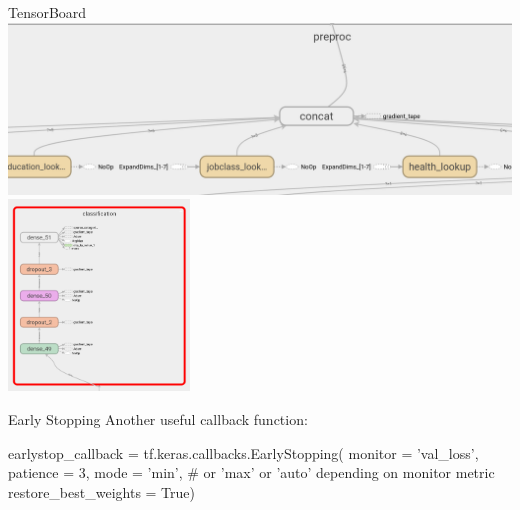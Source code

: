 \documentclass[ignorenonframetext,xcolor=x11names]{beamer}
\begin{document}
\begin{frame}{TensorBoard}
\centering
\includegraphics[width=.8\textwidth]{screen10.png} \\
\vspace{\baselineskip}
\includegraphics[height=2in]{screen9.png}
\end{frame}

\begin{frame}[fragile]{Early Stopping}
Another useful callback function:

\begin{pythoncode}
earlystop_callback = tf.keras.callbacks.EarlyStopping(
    monitor = 'val_loss',
    patience = 3,
    mode = 'min', 
    # or 'max' or 'auto' depending on monitor metric
    restore_best_weights = True)
\end{pythoncode}
\end{frame}
\end{document}
